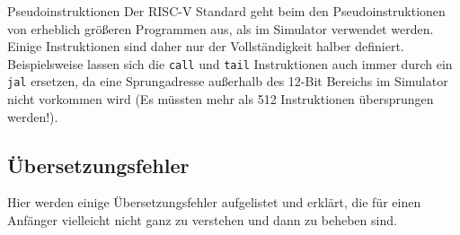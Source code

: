 

\begin{infoblock}{Pseudoinstruktionen}
	Der RISC-V Standard geht beim den Pseudoinstruktionen von erheblich größeren Programmen aus, als im Simulator verwendet werden. Einige Instruktionen sind daher nur der Vollständigkeit halber definiert. Beispielsweise lassen sich die \texttt{call} und \texttt{tail} Instruktionen auch immer durch ein \texttt{jal} ersetzen, da eine Sprungadresse außerhalb des 12-Bit Bereichs im Simulator nicht vorkommen wird (Es müssten mehr als 512 Instruktionen übersprungen werden!).
\end{infoblock}

\pagebreak
\subsection{Übersetzungsfehler}
\label{user-manual-riscv-errors}
Hier werden einige Übersetzungsfehler aufgelistet und erklärt, die für einen Anfänger vielleicht nicht ganz zu verstehen und dann zu beheben sind.

